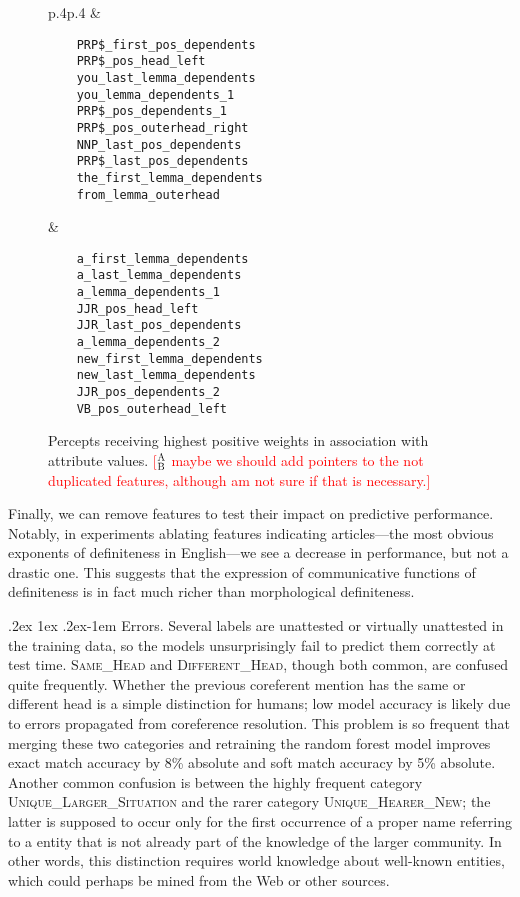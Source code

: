 \documentclass[11pt,letterpaper]{article}
\makeatletter
\newcommand{\ensuretext}[1]{#1}
\newcommand{\abmarker}{\ensuretext{\textcolor{red}{\ensuremath{^{\textsc{A}}_{\textsc{B}}}}}}
\newcommand{\arkcomment}[3]{\ensuretext{\textcolor{#3}{[#1 #2]}}}
\newcommand{\ab}[1]{\arkcomment{\abmarker}{#1}{red}}
\renewcommand{\paragraph}{%
  \@startsection{paragraph}{4}%
  {\z@}{.2ex \@plus 1ex \@minus .2ex}{-1em}%
  {\normalfont\normalsize\bfseries}%
}
\newcommand{\llbl}[1]{\mbox{\textsc{#1}}} %
\makeatother
\begin{document}
\begin{figure}\small\centering
\begin{tabular}{p{}p{}}
 &  \\
\begin{verbatim}
	PRP$_first_pos_dependents
	PRP$_pos_head_left
	you_last_lemma_dependents
	you_lemma_dependents_1
	PRP$_pos_dependents_1
	PRP$_pos_outerhead_right
	NNP_last_pos_dependents
	PRP$_last_pos_dependents
	the_first_lemma_dependents
	from_lemma_outerhead
\end{verbatim}
&
\begin{verbatim}
	a_first_lemma_dependents
	a_last_lemma_dependents
	a_lemma_dependents_1
	JJR_pos_head_left
	JJR_last_pos_dependents
	a_lemma_dependents_2
	new_first_lemma_dependents
	new_last_lemma_dependents
	JJR_pos_dependents_2
	VB_pos_outerhead_left
\end{verbatim}
\end{tabular}
\caption{Percepts receiving highest positive weights in association with attribute values. \ab{maybe we should add pointers to the not duplicated features, although am not sure if that is necessary.}}
\label{fig:weights}
\end{figure}

Finally, we can remove features to test their impact on predictive performance. 
Notably, in experiments ablating features indicating articles---the most obvious exponents of definiteness 
in English---we see a decrease in performance, but not a drastic one. 
This suggests that the expression of communicative functions of definiteness is in fact much richer than 
morphological definiteness.

\paragraph{Errors.}
Several labels are unattested or virtually unattested in the training data, 
so the models unsurprisingly fail to predict them correctly at test time. 
\llbl{Same\_Head} and \llbl{Different\_Head}, though both common, are confused quite frequently.
Whether the previous coreferent mention has the same or different head is a simple distinction for humans; 
low model accuracy is likely due to errors propagated from coreference resolution.
This problem is so frequent that merging these two categories and retraining the random forest model 
improves exact match accuracy by 8\% absolute and soft match accuracy by 5\% absolute.
Another common confusion is between the highly frequent category \llbl{Unique\_Larger\_Situation}
and the rarer category \llbl{Unique\_Hearer\_New}; the latter is supposed to occur
only for the first occurrence of a proper name referring to a entity 
that is not already part of the knowledge of the larger community. 
In other words, this distinction requires world knowledge about well-known entities, which could perhaps be mined 
from the Web or other sources.
\end{document}
